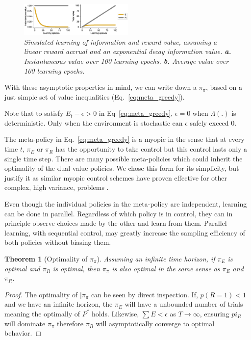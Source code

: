\documentclass[9pt,twocolumn,twoside]{pnas-new}
\newtheorem{theorem}{Theorem}
\begin{document}
\begin{figure}
\includegraphics[width=0.5\textwidth]{figures/simple_E_R_timecourse.eps}
\caption{
    \textit{Simulated learning of information and reward value, assuming a linear reward accrual and an exponential decay information value. 
    \textbf{a.} Instantaneous value over 100 learning epochs.  
    \textbf{b.} Average value over 100 learning epochs.}
}
\label{fig:simple_E_R_timecourse}
\end{figure}


With these asymptotic properties in mind, we can write down a $\pi_{\pi}$, based on a just simple set of value inequalities (Eq.~\ref{eq:meta_greedy}). 

Note that to satisfy $E_t - \epsilon > 0$ in Eq~\ref{eq:meta_greedy}, $\epsilon = 0$ when $\Lambda(.)$ is deterministic. Only when the environment is stochastic can $\epsilon$ safely exceed 0.

The meta-policy in Eq.~\ref{eq:meta_greedy} is a myopic in the sense that at every time $t$, $\pi_E$ or $\pi_R$ has the opportunity to take control but this control lasts only a single time step. There are many possible meta-policies which could inherit the optimality of the dual value policies. We chose this form for its simplicity, but justify it as similar myopic control schemes have proven effective for other complex, high variance, problems \cite{Hocker2019}.

Even though the individual policies in the meta-policy are independent, learning can be done in parallel. Regardless of which policy is in control, they can in principle observe choices made by the other and learn from them. Parallel learning, with sequential control, may greatly increase the sampling efficiency of both policies without biasing them.   

\begin{theorem}[Optimality of $\pi_{\pi}$] \label{theorem:meta}
    Assuming an infinite time horizon, if $\pi_E$ is optimal and $\pi_R$ is optimal, then $\pi_{\pi}$ is also optimal in the same sense as $\pi_E$ and $\pi_R$.
\end{theorem}
\begin{proof}
    The optimality of $|\pi_{\pi}$ can be seen by direct inspection. If, $p(R = 1) < 1$ and we have an infinite horizon, the $\pi_E$ will have a unbounded number of trials meaning the optimally of $P^*$ holds. Likewise, $\sum E < \epsilon$ as $T \rightarrow \infty$, ensuring $pi_R$ will dominate $\pi_{\pi}$ therefore $\pi_R$ will asymptotically converge to optimal behavior.
\end{proof}
\end{document}

